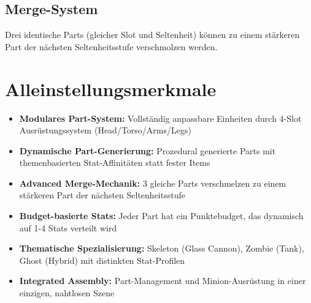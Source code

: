 \subsection{Merge-System}
Drei identische Parts (gleicher Slot und Seltenheit) können zu einem stärkeren Part der nächsten Seltenheitsstufe verschmolzen werden.

\section{Alleinstellungsmerkmale}

\begin{itemize}
    \item \textbf{Modulares Part-System:} Vollständig anpassbare Einheiten durch 4-Slot Ausrüstungssystem (Head/Torso/Arms/Legs)
    \item \textbf{Dynamische Part-Generierung:} Prozedural generierte Parts mit themenbasierten Stat-Affinitäten statt fester Items
    \item \textbf{Advanced Merge-Mechanik:} 3 gleiche Parts verschmelzen zu einem stärkeren Part der nächsten Seltenheitsstufe
    \item \textbf{Budget-basierte Stats:} Jeder Part hat ein Punktebudget, das dynamisch auf 1-4 Stats verteilt wird
    \item \textbf{Thematische Spezialisierung:} Skeleton (Glass Cannon), Zombie (Tank), Ghost (Hybrid) mit distinkten Stat-Profilen
    \item \textbf{Integrated Assembly:} Part-Management und Minion-Ausrüstung in einer einzigen, nahtlosen Szene
\end{itemize}
